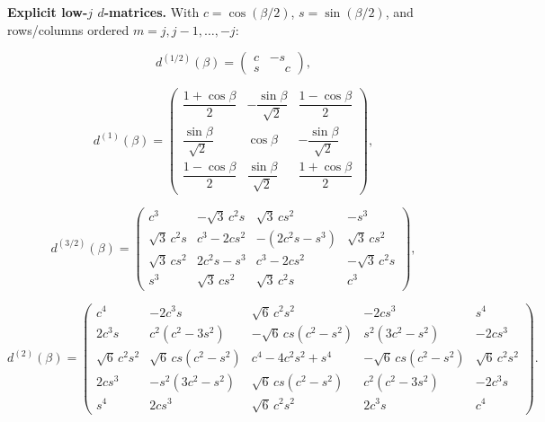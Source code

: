 \medskip\noindent\textbf{Explicit low-$j$ $d$-matrices.} With $c=\cos(\beta/2)$, $s=\sin(\beta/2)$, and rows/columns ordered $m=j,j-1,\ldots,-j$:
\begin{linenomath}
\begin{equation}
d^{(1/2)}(\beta)=
\begin{pmatrix}
c & -s\\[2pt]
s & \phantom{-}c
\end{pmatrix},
\label{eq:d-half}
\end{equation}
\end{linenomath}
\begin{linenomath}
\begin{equation}
d^{(1)}(\beta)=
\begin{pmatrix}
\dfrac{1+\cos\beta}{2} & -\dfrac{\sin\beta}{\sqrt2} & \dfrac{1-\cos\beta}{2}\\[8pt]
\dfrac{\sin\beta}{\sqrt2} & \cos\beta & -\dfrac{\sin\beta}{\sqrt2}\\[8pt]
\dfrac{1-\cos\beta}{2} & \dfrac{\sin\beta}{\sqrt2} & \dfrac{1+\cos\beta}{2}
\end{pmatrix},
\label{eq:d-one}
\end{equation}
\end{linenomath}
\begin{linenomath}
\begin{equation}
d^{(3/2)}(\beta)=
\begin{pmatrix}
c^{3} & -\sqrt3\,c^{2}s & \sqrt3\,cs^{2} & -s^{3}\\[2pt]
\sqrt3\,c^{2}s & c^{3}-2cs^{2} & -(2c^{2}s-s^{3}) & \sqrt3\,cs^{2}\\[2pt]
\sqrt3\,cs^{2} & 2c^{2}s-s^{3} & c^{3}-2cs^{2} & -\sqrt3\,c^{2}s\\[2pt]
s^{3} & \sqrt3\,cs^{2} & \sqrt3\,c^{2}s & c^{3}
\end{pmatrix},
\label{eq:d-threehalf}
\end{equation}
\end{linenomath}
\begin{linenomath}
\begin{equation}
d^{(2)}(\beta)=
\begin{pmatrix}
c^{4} & -2c^{3}s & \sqrt6\,c^{2}s^{2} & -2cs^{3} & s^{4}\\[2pt]
2c^{3}s & c^{2}(c^{2}-3s^{2}) & -\sqrt6\,cs(c^{2}-s^{2}) & s^{2}(3c^{2}-s^{2}) & -2cs^{3}\\[2pt]
\sqrt6\,c^{2}s^{2} & \sqrt6\,cs(c^{2}-s^{2}) & c^{4}-4c^{2}s^{2}+s^{4} & -\sqrt6\,cs(c^{2}-s^{2}) & \sqrt6\,c^{2}s^{2}\\[2pt]
2cs^{3} & -s^{2}(3c^{2}-s^{2}) & \sqrt6\,cs(c^{2}-s^{2}) & c^{2}(c^{2}-3s^{2}) & -2c^{3}s\\[2pt]
s^{4} & 2cs^{3} & \sqrt6\,c^{2}s^{2} & 2c^{3}s & c^{4}
\end{pmatrix}.
\label{eq:d-two}
\end{equation}
\end{linenomath}
